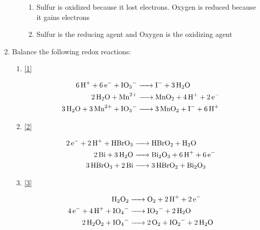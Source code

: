 \documentclass[12pt]{article}
\begin{document}
\begin{enumerate}
\begin{enumerate}
\begin{enumerate}
          \item Sulfur is oxidized because it lost electrons. Oxygen is reduced because it gains electrons
          
          \item Sulfur is the reducing agent and Oxygen is the oxidizing agent

        \end{enumerate}

    \end{enumerate}

  \item Balance the following redox reactions:

    \begin{enumerate}

      \item {} \eqref{1}

        \begin{equation}
          \begin{split}
          \ce{6H+ + 6e- + IO3- ->} & \ce{I- + 3H2O}\\
          \ce{2H2O + Mn^2+ ->} & \ce{MnO2 + 4H+ +2e-}\\
          \ce{3H2O + 3Mn^2+ + IO3- ->} & \ce{3MnO2 + I- + 6H+}\\
          \end{split}
          \label{1}
        \end{equation}

      \item {} \eqref{2}

        \begin{equation}
          \begin{split}
          \ce{2e- + 2H+ + HBrO3 ->} & \ce{HBrO2 + H2O}\\
          \ce{2Bi + 3H2O ->} & \ce{Bi2O3 + 6H+ + 6e-}\\
          \ce{3HBrO3 + 2Bi ->} & \ce{3HBrO2 + Bi2O3}\\
          \end{split}
          \label{2}
        \end{equation}

      \item {} \eqref{3}

        \begin{equation}
          \begin{split}
          \ce{H2O2 ->} & \ce{O2 + 2H+ + 2e-}\\
          \ce{4e- + 4H+ + IO4- ->} & \ce{IO2- + 2H2O}\\
          \ce{2H2O2 + IO4- ->} & \ce{2O2 + IO2- + 2H2O}\\
          \end{split}
          \label{3}
        \end{equation}

    \end{enumerate}

\end{enumerate}
\end{document}
